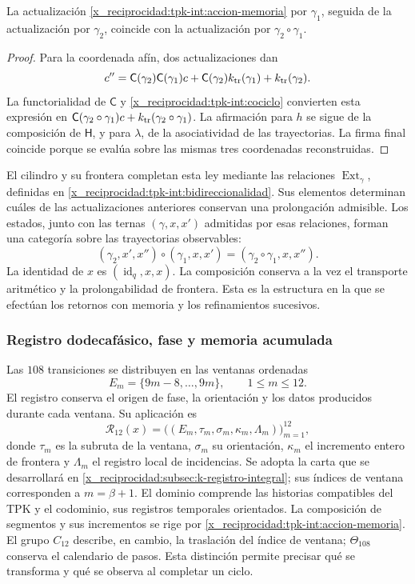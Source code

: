 \begin{proposition}
\label{x_reciprocidad:tpk-int:composicion-memoria}
La actualización \eqref{x_reciprocidad:tpk-int:accion-memoria} por
\(\gamma_1\), seguida de la actualización por \(\gamma_2\),
coincide con la actualización por \(\gamma_2\circ\gamma_1\).
\end{proposition}
\begin{proof}
Para la coordenada afín, dos actualizaciones dan
\[
 c''=\mathsf C(\gamma_2)\mathsf C(\gamma_1)c
       +\mathsf C(\gamma_2)k_{\rm tr}(\gamma_1)
       +k_{\rm tr}(\gamma_2).
\]
La functorialidad de \(\mathsf C\) y
\eqref{x_reciprocidad:tpk-int:cociclo} convierten esta expresión en
\(\mathsf C(\gamma_2\circ\gamma_1)c+
k_{\rm tr}(\gamma_2\circ\gamma_1)\).
La afirmación para \(h\) se sigue de la composición de
\(\mathsf H\), y para \(\lambda\), de la asociatividad de las
trayectorias. La firma final coincide porque se evalúa sobre las mismas
tres coordenadas reconstruidas.
\end{proof}

El cilindro y su frontera completan esta ley mediante las relaciones
\(\operatorname{Ext}_\gamma\), definidas en
\ref{x_reciprocidad:tpk-int:bidireccionalidad}. Sus elementos determinan cuáles de
las actualizaciones anteriores conservan una prolongación admisible.
Los estados, junto con las ternas \((\gamma,x,x')\) admitidas por
esas relaciones, forman una categoría sobre las trayectorias observables:
\[
 (\gamma_2,x',x'')\circ(\gamma_1,x,x')
     =(\gamma_2\circ\gamma_1,x,x'').
\]
La identidad de \(x\) es \((\operatorname{id}_q,x,x)\).
La composición conserva a la vez el transporte aritmético y la
prolongabilidad de frontera. Esta es la estructura en la que se efectúan
los retornos con memoria y los refinamientos sucesivos.

\subsubsection{Registro dodecafásico, fase y memoria acumulada}
\label{x_reciprocidad:tpk-int:dodecafase}

Las \(108\) transiciones se distribuyen en las ventanas ordenadas
\[
 E_m=\{9m-8,\ldots,9m\},\qquad 1\leq m\leq12.
\]
El registro conserva el origen de fase, la orientación y los datos
producidos durante cada ventana. Su aplicación es
\[
 \mathcal R_{12}(x)=
 \bigl((E_m,\tau_m,\sigma_m,\kappa_m,\Lambda_m)\bigr)_{m=1}^{12},
\]
donde \(\tau_m\) es la subruta de la ventana, \(\sigma_m\) su
orientación, \(\kappa_m\) el incremento entero de frontera y
\(\Lambda_m\) el registro local de incidencias. Se adopta la carta
que se desarrollará en \ref{x_reciprocidad:subsec:k-registro-integral}; sus índices
de ventana corresponden a \(m=\beta+1\).
El dominio comprende las historias compatibles
del TPK y el codominio, sus registros temporales orientados. La
composición de segmentos y sus incrementos se rige por
\eqref{x_reciprocidad:tpk-int:accion-memoria}. El grupo \(C_{12}\) describe, en
cambio, la traslación del índice de ventana; \(\Theta_{108}\) conserva
el calendario de pasos. Esta distinción permite precisar qué se transforma
y qué se observa al completar un ciclo.

